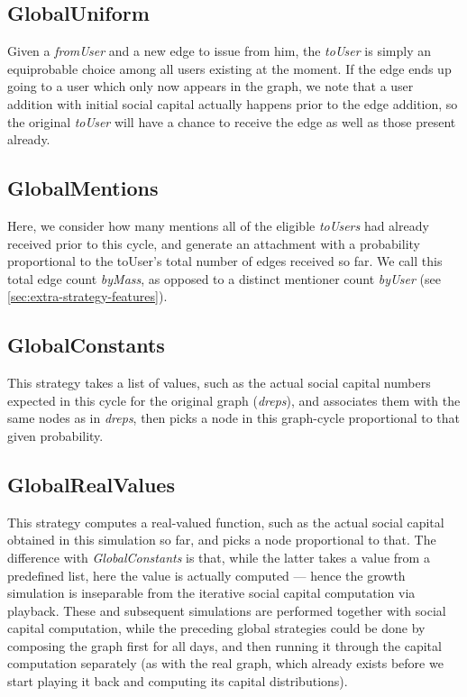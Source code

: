 \documentclass[10pt,oneside]{memoir}
\begin{document}
\pagebreak \subsection{GlobalUniform}
\label{globaluniform}

Given a {\itshape fromUser} and a new edge to issue from him, the {\itshape toUser} is simply an equiprobable choice among all users existing at the moment.  If the edge ends up going to a user which only now appears in the graph, we note that a user addition with initial social capital actually happens prior to the edge addition, so the original {\itshape toUser} will have a chance to receive the edge as well as those present already.


\subsection{GlobalMentions}
\label{globalmentions}

Here, we consider how many mentions all of the eligible {\itshape toUsers} had already received prior to this cycle, and generate an attachment with a probability proportional to the toUser's total number of edges received so far. We call this total edge count {\itshape byMass}, as opposed to a distinct mentioner count {\itshape byUser} (see \ref {sec:extra-strategy-features}).


\subsection{GlobalConstants}
\label{globalconstants}

This strategy takes a list of values, such as the actual social capital numbers expected in this cycle for the original graph ({\itshape dreps}), and associates them with the same nodes as in {\itshape dreps}, then picks a node in this graph-cycle proportional to that given probability.


\subsection{GlobalRealValues}
\label{globalrealvalues}

This strategy computes a real-valued function, such as the actual social capital obtained in this simulation so far, and picks a node proportional to that.  The difference with {\itshape GlobalConstants} is that, while the latter takes a value from a predefined list, here the value is actually computed --- hence the growth simulation is inseparable from the iterative social capital computation via playback.  These and subsequent simulations are performed together with social capital computation, while the preceding global strategies could be done by composing the graph first for all days, and then running it through the capital computation separately (as with the real graph, which already exists before we start playing it back and computing its capital distributions).
\end{document}

